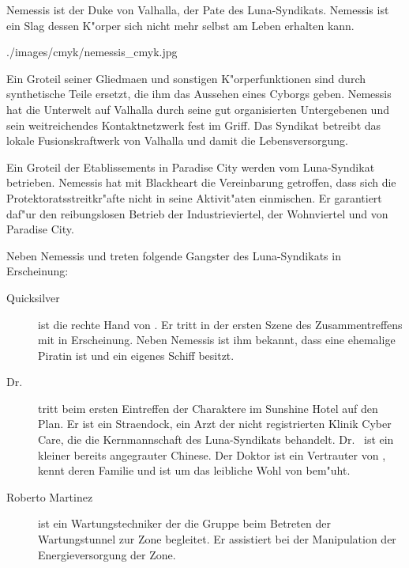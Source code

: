 
Nemessis ist der Duke von Valhalla, der Pate des Luna-Syndikats. Nemessis ist ein Slag dessen K"orper sich nicht mehr selbst am Leben erhalten kann. 

\begin{sideimagebox}[r]{0.9}{./images/cmyk/nemessis_cmyk.jpg}{}

\end{sideimagebox}

Ein Gro\3teil seiner Gliedma\3en und sonstigen K"orperfunktionen sind durch synthetische Teile ersetzt, die ihm das Aussehen eines Cyborgs geben. Nemessis hat die Unterwelt auf Valhalla durch seine gut organisierten Untergebenen und sein weitreichendes Kontaktnetzwerk
fest im Griff. Das Syndikat betreibt das lokale Fusionskraftwerk von Valhalla und damit die Lebensversorgung.

Ein Gro\3teil der Etablissements in Paradise City werden vom Luna-Syndikat betrieben. Nemessis hat mit Blackheart die Vereinbarung getroffen, dass sich die Protektoratsstreitkr"afte nicht in seine Aktivit"aten einmischen. Er garantiert daf"ur den reibungslosen Betrieb 
der Industrieviertel, der Wohnviertel und von Paradise City.


Neben Nemessis und \xl{} treten folgende Gangster des Luna-Syndikats in Erscheinung:

\begin{description}
    \item [Quicksilver] ist die rechte Hand von \xl{}. Er tritt in der ersten Szene des Zusammentreffens mit \xl{} in 
        Erscheinung. Neben Nemessis ist ihm bekannt, dass \xl{} eine ehemalige Piratin ist und ein eigenes Schiff besitzt.
    \item [Dr.~ ] tritt beim ersten Eintreffen der Charaktere im Sunshine Hotel auf den Plan. Er ist ein  
        Stra\3endock, ein Arzt der nicht registrierten Klinik  Cyber Care, die die Kernmannschaft des Luna-Syndikats behandelt. Dr.~  ist ein kleiner bereits angegrauter Chinese. Der Doktor ist ein Vertrauter von \xl{}, kennt deren Familie und ist um das leibliche Wohl von \xl{} bem"uht.
    \item [Roberto Martinez] ist ein Wartungstechniker der die Gruppe beim Betreten der Wartungstunnel zur Zone begleitet. 
        Er assistiert \xl{} bei der Manipulation der Energieversorgung der Zone.
\end{description}
